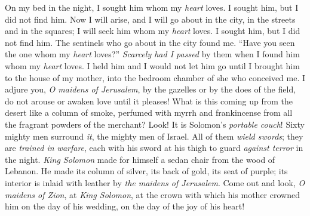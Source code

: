 \begin{biblechapter} %
 On my bed in the night, 
I sought him whom my \textit{heart} loves. 
I sought him, but I did not find him.
\verse Now I will arise, and I will go about in the city, 
in the streets and in the squares; 
I will seek him whom my \textit{heart} loves. 
I sought him, but I did not find him.
\verse The sentinels who go about in the city found me. 
“Have you seen the one whom my \textit{heart} loves?”
\verse \textit{Scarcely had I passed} by them 
when I found him whom my \textit{heart} loves. 
I held him and I would not let him go 
until I brought him to the house of my mother, 
into the bedroom chamber of she who conceived me.
 I adjure you, \textit{O maidens of Jerusalem}, 
by the gazelles or by the does of the field, 
do not arouse or awaken love until it pleases!
 What is this coming up from the desert 
like a column of smoke, 
perfumed with myrrh and frankincense 
from all the fragrant powders of the merchant?
\verse Look! It is Solomon’s \textit{portable couch}! 
Sixty mighty men surround \textit{it}, 
the mighty men of Israel.
\verse All of them \textit{wield swords}; 
they are \textit{trained in warfare}, 
each with his sword at his thigh 
to guard \textit{against terror} in the night.
\verse \textit{King Solomon} made for himself a sedan chair 
from the wood of Lebanon.
\verse He made its column of silver, its back of gold, its seat of purple; 
its interior is inlaid with leather by \textit{the maidens of Jerusalem}.
\verse Come out and look, \textit{O maidens of Zion}, at \textit{King Solomon}, 
at the crown with which his mother crowned him 
on the day of his wedding, 
on the day of the joy of his heart!
\end{biblechapter}

